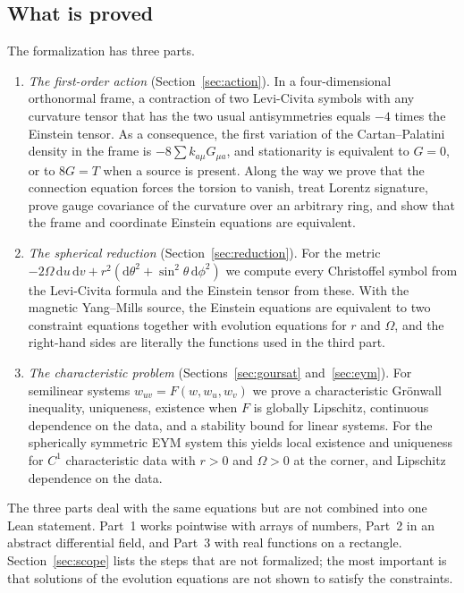 \documentclass[pdflatex,sn-mathphys-num]{sn-jnl}%
\theoremstyle{thmstyleone}%
\theoremstyle{thmstyletwo}%
\theoremstyle{thmstylethree}%
\newcommand{\dd}{\mathrm{d}}
\begin{document}
\subsection{What is proved}\label{subsec:contrib}

The formalization has three parts.
\begin{enumerate}
\item \emph{The first-order action} (Section~\ref{sec:action}). In a four-dimensional orthonormal frame, a contraction of two Levi-Civita symbols with any curvature tensor that has the two usual antisymmetries equals $-4$ times the Einstein tensor. As a consequence, the first variation of the Cartan--Palatini density in the frame is $-8\sum k_{a\mu}G_{\mu a}$, and stationarity is equivalent to $G=0$, or to $8G=T$ when a source is present. Along the way we prove that the connection equation forces the torsion to vanish, treat Lorentz signature, prove gauge covariance of the curvature over an arbitrary ring, and show that the frame and coordinate Einstein equations are equivalent.
\item \emph{The spherical reduction} (Section~\ref{sec:reduction}). For the metric $-2\Omega\,\dd u\,\dd v+r^2(\dd\theta^2+\sin^2\theta\,\dd\phi^2)$ we compute every Christoffel symbol from the Levi-Civita formula and the Einstein tensor from these. With the magnetic Yang--Mills source, the Einstein equations are equivalent to two constraint equations together with evolution equations for $r$ and $\Omega$, and the right-hand sides are literally the functions used in the third part.
\item \emph{The characteristic problem} (Sections~\ref{sec:goursat} and~\ref{sec:eym}). For semilinear systems $w_{uv}=F(w,w_u,w_v)$ we prove a characteristic Gr\"onwall inequality, uniqueness, existence when $F$ is globally Lipschitz, continuous dependence on the data, and a stability bound for linear systems. For the spherically symmetric EYM system this yields local existence and uniqueness for $C^1$ characteristic data with $r>0$ and $\Omega>0$ at the corner, and Lipschitz dependence on the data.
\end{enumerate}
The three parts deal with the same equations but are not combined into one Lean statement. Part~1 works pointwise with arrays of numbers, Part~2 in an abstract differential field, and Part~3 with real functions on a rectangle. Section~\ref{sec:scope} lists the steps that are not formalized; the most important is that solutions of the evolution equations are not shown to satisfy the constraints.
\end{document}
